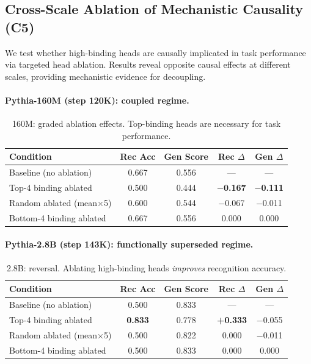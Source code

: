 \documentclass[10pt]{article} %
\begin{document}
\subsection{Cross-Scale Ablation of Mechanistic Causality (C5)}\label{sec:c5}

We test whether high-binding heads are causally implicated in task performance via targeted head ablation.
Results reveal opposite causal effects at different scales, providing mechanistic evidence for decoupling.

\paragraph{Pythia-160M (step 120K): coupled regime.}\mbox{}

\begin{table}[H]
\centering
\begin{tabular}{|l|c|c|c|c|}
\hline
\textbf{Condition} & \textbf{Rec Acc} & \textbf{Gen Score} & \textbf{Rec $\Delta$} & \textbf{Gen $\Delta$} \\
\hline
Baseline (no ablation) & 0.667 & 0.556 & --- & --- \\
Top-4 binding ablated & 0.500 & 0.444 & \textbf{$-$0.167} & \textbf{$-$0.111} \\
Random ablated (mean$\times$5) & 0.600 & 0.544 & $-$0.067 & $-$0.011 \\
Bottom-4 binding ablated & 0.667 & 0.556 & 0.000 & 0.000 \\
\hline
\end{tabular}
\caption{160M: graded ablation effects. Top-binding heads are necessary for task performance.}
\label{tab:c5_160m_ablation}
\end{table}

\paragraph{Pythia-2.8B (step 143K): functionally superseded regime.}\mbox{}

\begin{table}[h]
\centering
\begin{tabular}{|l|c|c|c|c|}
\hline
\textbf{Condition} & \textbf{Rec Acc} & \textbf{Gen Score} & \textbf{Rec $\Delta$} & \textbf{Gen $\Delta$} \\
\hline
Baseline (no ablation) & 0.500 & 0.833 & --- & --- \\
Top-4 binding ablated & \textbf{0.833} & 0.778 & \textbf{+0.333} & $-$0.055 \\
Random ablated (mean$\times$5) & 0.500 & 0.822 & 0.000 & $-$0.011 \\
Bottom-4 binding ablated & 0.500 & 0.833 & 0.000 & 0.000 \\
\hline
\end{tabular}
\caption{2.8B: reversal. Ablating high-binding heads \emph{improves} recognition accuracy.}
\label{tab:c5_28b_ablation}
\end{table}
\end{document}
